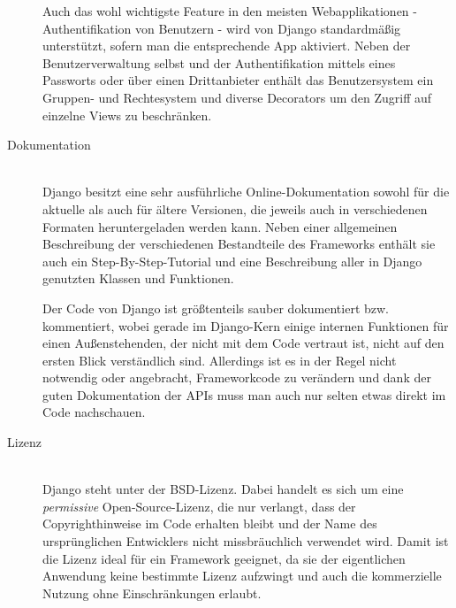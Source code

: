 \begin{description}
Auch das wohl wichtigste Feature in den meisten Webapplikationen - Authentifikation von Benutzern -
wird von Django standardmäßig unterstützt, sofern man die entsprechende App aktiviert. Neben der
Benutzerverwaltung selbst und der Authentifikation mittels eines Passworts oder über einen
Drittanbieter enthält das Benutzersystem ein Gruppen- und Rechtesystem und diverse Decorators um
den Zugriff auf einzelne Views zu beschränken.


\item[Dokumentation] \hfill \\
Django besitzt eine sehr ausführliche Online-Dokumentation sowohl für die aktuelle als auch für
ältere Versionen, die jeweils auch in verschiedenen Formaten heruntergeladen werden kann. Neben
einer allgemeinen Beschreibung der verschiedenen Bestandteile des Frameworks enthält sie auch ein
Step-By-Step-Tutorial und eine Beschreibung aller in Django genutzten Klassen und Funktionen.

Der Code von Django ist größtenteils sauber dokumentiert bzw. kommentiert, wobei gerade im
Django-Kern einige internen Funktionen für einen Außenstehenden, der nicht mit dem Code vertraut
ist, nicht auf den ersten Blick verständlich sind. Allerdings ist es in der Regel nicht notwendig
oder angebracht, Frameworkcode zu verändern und dank der guten Dokumentation der APIs muss man auch
nur selten etwas direkt im Code nachschauen.


\item[Lizenz] \hfill \\
Django steht unter der BSD-Lizenz. Dabei handelt es sich um eine \emph{permissive}
Open-Source-Lizenz, die nur verlangt, dass der Copyrighthinweise im Code erhalten bleibt und der
Name des ursprünglichen Entwicklers nicht missbräuchlich verwendet wird. Damit ist die Lizenz ideal
für ein Framework geeignet, da sie der eigentlichen Anwendung keine bestimmte Lizenz aufzwingt und
auch die kommerzielle Nutzung ohne Einschränkungen erlaubt.


\end{description}
